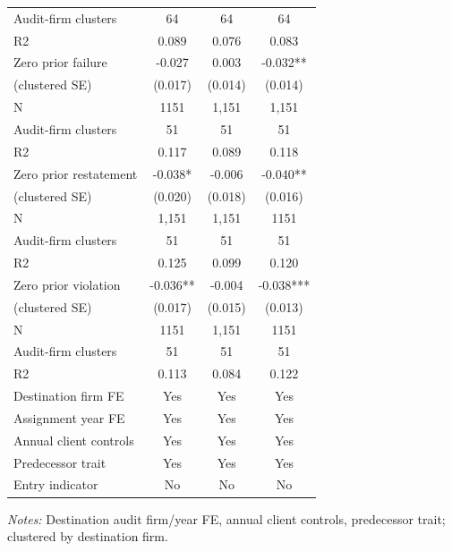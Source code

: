 \begin{table}[htbp]
\begin{threeparttable}
\begin{tabular}{p{}ccc}
Audit-firm clusters & 64 & 64 & 64 \\
R2 & 0.089 & 0.076 & 0.083 \\
Zero prior failure & -0.027 & 0.003 & -0.032** \\
(clustered SE) & (0.017) & (0.014) & (0.014) \\
N & 1151 & 1,151 & 1,151 \\
Audit-firm clusters & 51 & 51 & 51 \\
R2 & 0.117 & 0.089 & 0.118 \\
Zero prior restatement & -0.038* & -0.006 & -0.040** \\
(clustered SE) & (0.020) & (0.018) & (0.016) \\
N & 1,151 & 1,151 & 1151 \\
Audit-firm clusters & 51 & 51 & 51 \\
R2 & 0.125 & 0.099 & 0.120 \\
Zero prior violation & -0.036** & -0.004 & -0.038*** \\
(clustered SE) & (0.017) & (0.015) & (0.013) \\
N & 1151 & 1,151 & 1151 \\
Audit-firm clusters & 51 & 51 & 51 \\
R2 & 0.113 & 0.084 & 0.122 \\
Destination firm FE & Yes & Yes & Yes \\
Assignment year FE & Yes & Yes & Yes \\
Annual client controls & Yes & Yes & Yes \\
Predecessor trait & Yes & Yes & Yes \\
Entry indicator & No & No & No \\
\bottomrule
\end{tabular}
\begin{tablenotes}\footnotesize
\item \raggedright \textit{Notes:} Destination audit firm/year FE, annual client controls, predecessor trait; clustered by destination firm.
\end{tablenotes}
\end{threeparttable}
\end{table}
